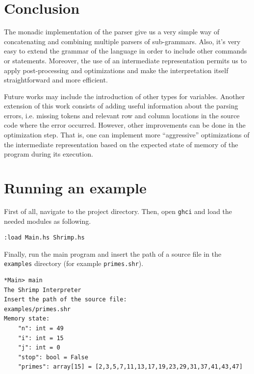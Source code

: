 \documentclass[12pt,a4paper]{article}
\begin{document}
\section*{Conclusion}
The monadic implementation of the parser give us a very simple way of concatenating and combining multiple parsers of sub-grammars.
Also, it's very easy to extend the grammar of the language in order to include other commands or statements.
Moreover, the use of an intermediate representation permits us to apply post-processing and optimizations and make the interpretation itself straightforward and more efficient.

Future works may include the introduction of other types for variables.
Another extension of this work consists of adding useful information about the parsing errors, i.e. missing tokens and relevant row and column locations in the source code where the error occurred.
However, other improvements can be done in the optimization step.
That is, one can implement more ``aggressive'' optimizations of the intermediate representation based on the expected state of memory of the program during its execution.

\clearpage

\section*{Running an example}
First of all, navigate to the project directory.
Then, open \texttt{ghci} and load the needed modules as following.
\begin{lstlisting}[style=custom-style]
:load Main.hs Shrimp.hs
\end{lstlisting}
Finally, run the main program and insert the path of a source file in the \texttt{examples} directory (for example \texttt{primes.shr}).
\begin{lstlisting}[style=custom-style]
*Main> main
The Shrimp Interpreter
Insert the path of the source file:
examples/primes.shr
Memory state:
    "n": int = 49
    "i": int = 15
    "j": int = 0
    "stop": bool = False
    "primes": array[15] = [2,3,5,7,11,13,17,19,23,29,31,37,41,43,47]
\end{lstlisting}
\end{document}
